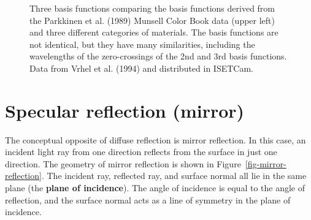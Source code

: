 \documentclass[
  letterpaper,
]{book}
\begin{document}
\begin{figure}


\caption{\label{fig-reflectance-bases}Three basis functions comparing
the basis functions derived from the Parkkinen et al. (1989) Munsell
Color Book data (upper left) and three different categories of
materials. The basis functions are not identical, but they have many
similarities, including the wavelengths of the zero-crossings of the 2nd
and 3rd basis functions. Data from Vrhel et al. (1994) and distributed
in ISETCam.}

\end{figure}%

\section{Specular reflection (mirror)}\label{specular-reflection-mirror}

The conceptual opposite of diffuse reflection is mirror reflection. In
this case, an incident light ray from one direction reflects from the
surface in just one direction. The geometry of mirror reflection is
shown in Figure~\ref{fig-mirror-reflection}. The incident ray, reflected
ray, and surface normal all lie in the same plane (the \textbf{plane of
incidence}). The angle of incidence is equal to the angle of reflection,
and the surface normal acts as a line of symmetry in the plane of
incidence.
\end{document}
